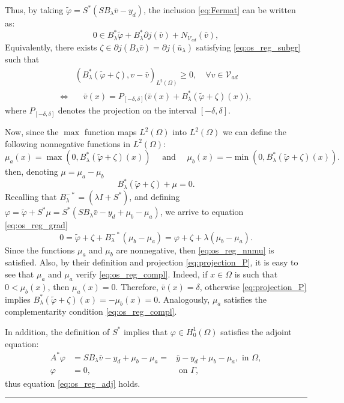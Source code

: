 \documentclass[11pt,a4paper]{amsart}
\newcommand{\kw}{\rule{2mm}{2mm}}
\newcommand{\om}{\Omega}
\newcommand{\ga}{\Gamma}
\renewenvironment{proof}{{Proof.}}{\hfill\kw}
\begin{document}
\begin{proof}
\begin{equation}
\end{equation}
Thus, by taking $\tilde\varphi=S^*(SB_\lambda \bar v -y_d)$, the inclusion \eqref{eq:Fermat} can be written as: 
\begin{equation}\label{eq:gradient_convex}
0 \in B^*_{\lambda}\tilde\varphi+  B^*_{\lambda}\partial j(\bar v) +N_{\mathcal{V}_{ad}}(\bar v),
\end{equation}
Equivalently, there exists $\zeta \in \partial j(B_{\lambda}\bar v) = \partial j(\bar u_\lambda)$ satisfying \eqref{eq:os_reg_subgr} such that 
\begin{align}
	 &( B^*_{\lambda}(\tilde\varphi+ \zeta), v - \bar{v})_{L^2(\om)} \geq 0, \quad \forall v \in \mathcal{V}_{ad} \nonumber \\
	 \Leftrightarrow  &\quad \bar v(x) = P_{[-\delta,\delta]}\big( \bar v(x) + B^*_{\lambda}(\tilde\varphi+ \zeta)(x)\big), \label{eq:projection_P}
\end{align}
where $P_{[-\delta,\delta]}$ denotes the projection on the interval $[-\delta,\delta]$. 

Now, since the $\max$ function maps $L^2(\om)$ into $L^2(\om)$ we can define  the following nonnegative functions in $L^2(\om)$: %
\begin{equation*}
    \mu_a(x) = \max(0,B_\lambda^*(\tilde\varphi+ \zeta)(x)) \quad \mbox{ and } \quad \mu_b(x) = -\min(0,B_\lambda^*(\tilde\varphi+ \zeta)(x)).
\end{equation*}
% 
then, denoting $\mu=\mu_a -\mu_b$
$$ B^*_{\lambda}(\tilde\varphi+ \zeta) +\mu =0. $$ 
Recalling that $B^{-*}_{\lambda}= (\lambda I + S^*)$, and defining  $\varphi = \tilde\varphi + S^*\mu = S^*(SB_\lambda \bar v -y_d +\mu_b-\mu_a)$, we arrive to equation \eqref{eq:os_reg_grad}
%
$$ 0=\tilde\varphi +\zeta + B^{-*}_{\lambda}(\mu_b-\mu_a)= \varphi +\zeta + \lambda (\mu_b-\mu_a).  $$
%
Since the functions $\mu_a$ and $\mu_b$ are nonnegative, then \eqref{eq:os_reg_nnmu} is satisfied. Also, by their definition and projection \eqref{eq:projection_P}, it is easy to see that $\mu_a$ and $\mu_a$ verify \eqref{eq:os_reg_compl}. Indeed, if $x\in \om$ is such that $0<\mu_b(x)$, then $\mu_a(x)=0$. Therefore,
$\bar v(x) = \delta $, otherwise \eqref{eq:projection_P} implies $B_\lambda^*(\tilde \varphi +\zeta)(x) =-\mu_b(x)=0$. Analogously,  $\mu_a$ satisfies the complementarity condition \eqref{eq:os_reg_compl}.

In addition, the definition of $S^*$ implies that $\varphi \in H_0^1(\om)$ satisfies the adjoint equation: 
\begin{equation*}
\begin{array}{rlr}
	A^*\varphi & =  SB_\lambda \bar v -y_d + \mu_b-\mu_a =& \bar y -y_d + \mu_b-\mu_a, \text{ in } \om, \\
      \varphi &= 0, & \text{ on } \ga ,
\end{array}
\end{equation*}
thus equation \eqref{eq:os_reg_adj} holds. 
\end{proof}
\end{document}
